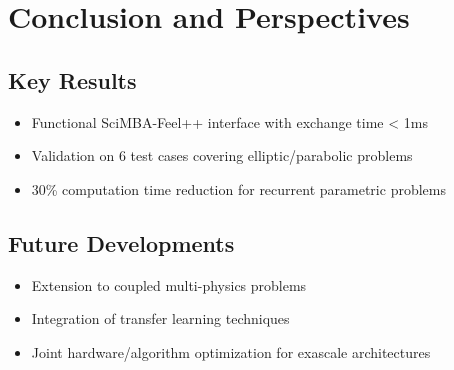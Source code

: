 \documentclass{article}
\begin{document}
\section{Conclusion and Perspectives}
\subsection{Key Results}
\begin{itemize}
\item Functional SciMBA-Feel++ interface with exchange time < 1ms
\item Validation on 6 test cases covering elliptic/parabolic problems
\item 30\% computation time reduction for recurrent parametric problems
\end{itemize}

\subsection{Future Developments}
\begin{itemize}
\item Extension to coupled multi-physics problems
\item Integration of transfer learning techniques
\item Joint hardware/algorithm optimization for exascale architectures
\end{itemize}
\end{document}
